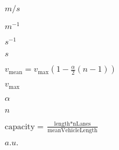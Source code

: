 \documentclass{article}
\begin{document}
$m/s$
\pagebreak

$m^{-1}$
\pagebreak

$s^{-1}$
\pagebreak

$s$
\pagebreak

$ v_{\text{mean}} = v_{\text{max}} \left(1 - \frac{\alpha}{2} \left( n - 1\right)  \right) $
\pagebreak

$ v_{\text{max}} $
\pagebreak

$ \alpha $
\pagebreak

$ n $
\pagebreak

$ \text{capacity} = \frac{\text{length} * \text{nLanes}}{\text{meanVehicleLength}} $
\pagebreak

$a.u.$
\pagebreak
\end{document}
